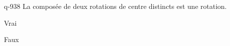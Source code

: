 \begin{truefalse}{q-938}
La composée de deux rotations de centre distincts est une rotation.
\item Vrai
\item* Faux
\end{truefalse}

